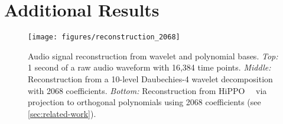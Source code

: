 \documentclass{article}
\theoremstyle{plain}
\theoremstyle{definition}
\theoremstyle{remark}
\begin{document}
\section{Additional Results}
\label{app:other-exps}

\begin{figure}[h]
    \texttt{[image: figures/reconstruction\_2068]}
    \centering
    \vspace{-3mm}
    \caption{Audio signal reconstruction from wavelet and polynomial bases. \emph{Top:} 1 second of a raw audio waveform with 16,384 time points. \emph{Middle:} Reconstruction from a 10-level Daubechies-4 wavelet decomposition with 2068 coefficients. \emph{Bottom:} Reconstruction from HiPPO~~\citep{gu2020hippo} via projection to orthogonal polynomials using 2068 coefficients (see \cref{sec:related-work}).}  \vspace{-4mm}
\label{fig:audio}
\end{figure}
\end{document}
